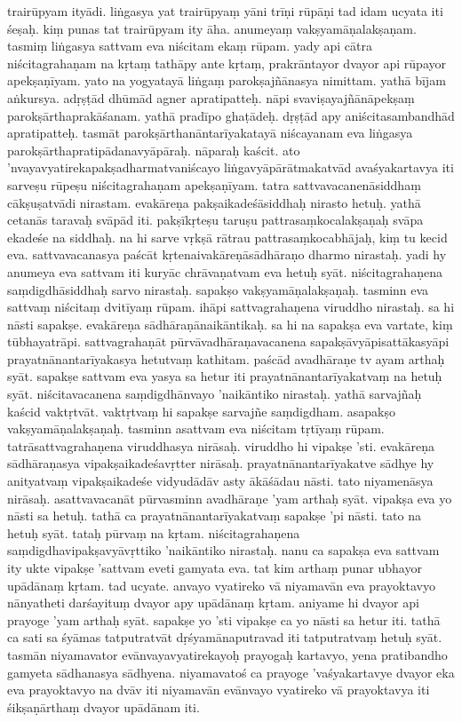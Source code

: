 \documentclass{article}
\begin{document}
trairūpyam ityādi. liṅgasya yat trairūpyaṃ yāni trīṇi rūpāṇi tad idam ucyata iti śeṣaḥ. kiṃ punas tat trairūpyam ity āha. anumeyaṃ vakṣyamāṇalakṣaṇam. tasmiṃ liṅgasya sattvam eva niścitam ekaṃ rūpam. yady api cātra niścitagrahaṇam na kṛtaṃ tathāpy ante kṛtaṃ, prakrāntayor dvayor api rūpayor apekṣaṇīyam. yato na yogyatayā liṅgaṃ parokṣajñānasya nimittam. yathā  bījam aṅkursya. adṛṣṭād dhūmād agner apratipatteḥ. nāpi svaviṣayajñānāpekṣaṃ parokṣārthaprakāśanam. yathā pradīpo ghaṭādeḥ. dṛṣṭād apy aniścitasambandhād apratipatteḥ. tasmāt parokṣārthanāntarīyakatayā niścayanam eva liṅgasya parokṣārthapratipādanavyāpāraḥ. nāparaḥ kaścit. ato 'nvayavyatirekapakṣadharmatvaniścayo liṅgavyāpārātmakatvād avaśyakartavya iti sarveṣu rūpeṣu niścitagrahaṇam apekṣaṇīyam.
\pend
\pstart
 tatra sattvavacanenāsiddhaṃ cākṣuṣatvādi nirastam. evakāreṇa pakṣaikadeśāsiddhaḥ nirasto hetuḥ. yathā cetanās taravaḥ svāpād iti. pakṣīkṛteṣu taruṣu pattrasaṃkocalakṣaṇaḥ svāpa ekadeśe na siddhaḥ. na hi sarve vṛkṣā rātrau pattrasaṃkocabhājaḥ, kiṃ tu kecid eva. sattvavacanasya paścāt kṛtenaivakāreṇāsādhāraṇo dharmo nirastaḥ. yadi hy anumeya eva sattvam iti kuryāc chrāvaṇatvam eva hetuḥ syāt. niścitagrahaṇena saṃdigdhāsiddhaḥ sarvo nirastaḥ.
\pend
\pstart
 sapakṣo vakṣyamāṇalakṣaṇaḥ. tasminn eva sattvaṃ niścitaṃ dvitīyaṃ rūpam. ihāpi sattvagrahaṇena viruddho nirastaḥ. sa hi nāsti sapakṣe. evakāreṇa sādhāraṇānaikāntikaḥ. sa hi na sapakṣa eva vartate, kiṃ tūbhayatrāpi. sattvagrahaṇāt pūrvāvadhāraṇavacanena sapakṣāvyāpisattākasyāpi prayatnānantarīyakasya hetutvaṃ kathitam. paścād avadhāraṇe tv ayam arthaḥ syāt. sapakṣe sattvam eva yasya sa hetur iti prayatnānantarīyakatvaṃ na hetuḥ syāt. niścitavacanena saṃdigdhānvayo 'naikāntiko nirastaḥ. yathā sarvajñaḥ kaścid vaktṛtvāt. vaktṛtvaṃ hi sapakṣe sarvajñe saṃdigdham. 
\pend
\pstart
 asapakṣo vakṣyamāṇalakṣaṇaḥ. tasminn asattvam eva niścitam tṛtīyaṃ rūpam. tatrāsattvagrahaṇena viruddhasya nirāsaḥ. viruddho hi vipakṣe 'sti. evakāreṇa sādhāraṇasya vipakṣaikadeśavṛtter nirāsaḥ. prayatnānantarīyakatve sādhye hy anityatvaṃ vipakṣaikadeśe vidyudādāv asty ākāśādau nāsti. tato niyamenāsya nirāsaḥ. asattvavacanāt pūrvasminn avadhāraṇe 'yam arthaḥ syāt. vipakṣa eva yo nāsti sa hetuḥ. tathā ca prayatnānantarīyakatvaṃ sapakṣe 'pi nāsti. tato na hetuḥ syāt. tataḥ pūrvaṃ na kṛtam. niścitagrahaṇena saṃdigdhavipakṣavyāvṛttiko 'naikāntiko nirastaḥ. 
\pend
\pstart 
 nanu ca sapakṣa eva sattvam ity ukte vipakṣe 'sattvam eveti gamyata eva. tat kim arthaṃ punar ubhayor upādānaṃ kṛtam. tad ucyate. anvayo vyatireko vā niyamavān eva prayoktavyo nānyatheti darśayituṃ dvayor apy upādānaṃ kṛtam. aniyame hi dvayor api prayoge 'yam arthaḥ syāt. sapakṣe yo 'sti vipakṣe ca yo nāsti sa hetur iti. tathā ca sati sa śyāmas tatputratvāt dṛśyamānaputravad iti tatputratvaṃ hetuḥ syāt. tasmān niyamavator evānvayavyatirekayoḥ prayogaḥ kartavyo, yena pratibandho gamyeta sādhanasya sādhyena. niyamavatoś ca prayoge 'vaśyakartavye dvayor eka eva prayoktavyo na dvāv iti niyamavān evānvayo vyatireko vā prayoktavya iti śikṣaṇārthaṃ dvayor upādānam iti.
\pend
{}\baselineskip
\end{document}
